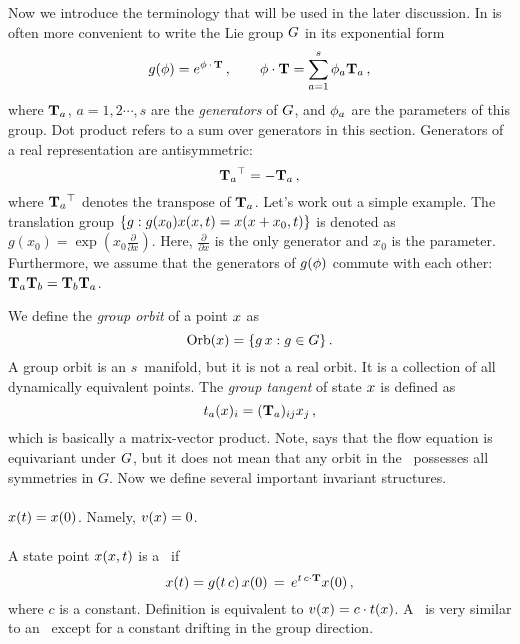 Now we introduce the terminology that will be used in the later discussion.
In is often more convenient to write the Lie group
$G$ in its exponential form
\begin{equation}
  g({\bf \phi})=e^{{\bf \phi} \,\cdot\, \mathbf{T} }
  \,,\qquad
  {\bf \phi} \cdot \mathbf{T}  = \sum_{a=1}^s {\bf \phi}_a \mathbf{T}_a
  \,,
  \label{eq:Lie}
\end{equation}
where $\mathbf{T}_a$, $a=1, 2\cdots, s$
are the \emph{generators} of $G$, and ${\bf \phi}_a$ are
the parameters of this group.  Dot product refers to a sum over
generators in this section.
Generators of a real representation are antisymmetric:
\begin{equation}
  \label{eq:Tanti}
  {\ensuremath{\mathbf{T}}_a}{}^\top = - \mathbf{T}_a
  \,,
\end{equation}
where ${\mathbf{T}_a}{}^\top$ denotes the transpose of $\mathbf{T}_a$.
Let's work out a simple example. The
translation group $\{ g : g(x_0)x(x, t) = x(x+x_0, t) \}$
is denoted as $g(x_0) = \exp(x_0 \frac{\partial}{\partial x})$. Here,
$\frac{\partial}{\partial x}$ is the only generator and
$x_0$ is the parameter. Furthermore, we assume that the generators
of $g({\bf \phi})$ commute with each other: $\mathbf{T}_a\mathbf{T}_b = \mathbf{T}_b\mathbf{T}_a$.

We define the \emph{group orbit} of a point $x$ as
\begin{equation}
  \mathrm{Orb}(x) = \{g\,x : g \in {\ensuremath{G}}\}
  \,.
  \label{eq:orb}
\end{equation}
A group orbit is an $s$\dmn\ manifold, but it is
not a real orbit. It is a collection of all
dynamically equivalent points.
The \emph{group tangent} of state $x$ is defined as
\begin{equation}
  t_a(x)_{i}= (\mathbf{T}_a){}_{ij} x_j
  \,,
  \label{eq:gTan}
\end{equation}
which is basically a matrix-vector product.
Note,  says that the flow equation is
equivariant under $G$, but it does not mean that
any orbit in the \statesp\ possesses all symmetries in $G$.
Now we define several important invariant structures.

\paragraph{\Eqv} $x(t) = x(0)$. Namely, $v(x) = 0$.

\paragraph{\Reqv} A state point $x(x, t)$
is a \reqv\ if
\begin{equation}
  x(t) = g(t \, c) \, x(0)
  \,=\, e^{t \, c \cdot \mathbf{T}} x(0)
  \,,
  \label{eq:req}
\end{equation}
where $c$ is a constant. Definition  is equivalent to
$v(x) = c \cdot t(x)$. A \reqv\ is
very similar to an \eqv\ except for a constant drifting in the
group direction.

